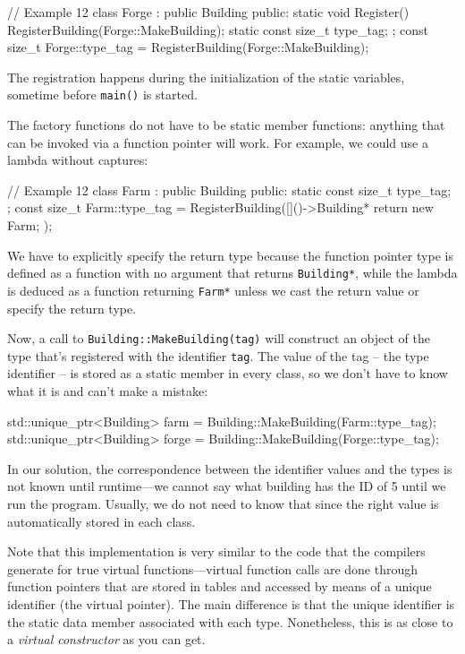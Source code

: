 \begin{code}
// Example 12
class Forge : public Building {
  public:
  static void Register() {
    RegisterBuilding(Forge::MakeBuilding);
  }
  static const size_t type_tag;
};
const size_t Forge::type_tag =
  RegisterBuilding(Forge::MakeBuilding);
\end{code}

The registration happens during the initialization of the static variables, sometime before \texttt{main()} is started.

The factory functions do not have to be static member functions: anything that can be invoked via a function pointer will work. For example, we could use a lambda without captures:

\begin{code}
// Example 12
class Farm : public Building {
  public:
  static const size_t type_tag;
};
const size_t Farm::type_tag =
  RegisterBuilding([]()->Building* { return new Farm; });
\end{code}

We have to explicitly specify the return type because the function pointer type is defined as a function with no argument that returns \texttt{Building*}, while the lambda is deduced as a function returning \texttt{Farm*} unless we cast the return value or specify the return type.

Now, a call to \texttt{Building::MakeBuilding(tag)} will construct an object of the type that's registered with the identifier \texttt{tag}. The value of the tag -- the type identifier -- is stored as a static member in every class, so we don't have to know what it is and can't make a mistake:

\begin{code}
std::unique_ptr<Building> farm =
  Building::MakeBuilding(Farm::type_tag);
std::unique_ptr<Building> forge =
  Building::MakeBuilding(Forge::type_tag);
\end{code}

In our solution, the correspondence between the identifier values and the types is not known until runtime---we cannot say what building has the ID of 5 until we run the program. Usually, we do not need to know that since the right value is automatically stored in each class.

Note that this implementation is very similar to the code that the compilers generate for true virtual functions---virtual function calls are done through function pointers that are stored in tables and accessed by means of a unique identifier (the virtual pointer). The main difference is that the unique identifier is the static data member associated with each type. Nonetheless, this is as close to a \emph{virtual constructor} as you can get.

